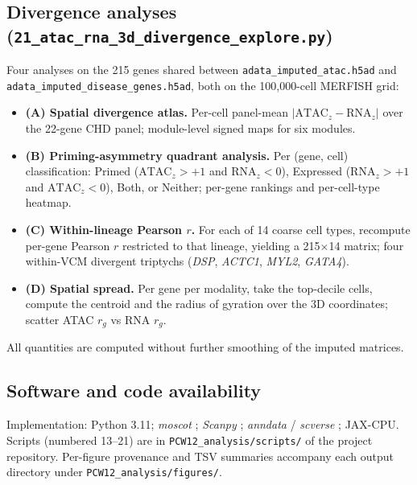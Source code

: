 \documentclass[11pt,a4paper]{article}
\begin{document}
\subsection{Divergence analyses
(\texttt{21\_atac\_rna\_3d\_divergence\_explore.py})}
Four analyses on the 215 genes shared between
\texttt{adata\_imputed\_atac.h5ad} and
\texttt{adata\_imputed\_disease\_genes.h5ad}, both on the 100{,}000-cell
MERFISH grid:
\begin{itemize}[leftmargin=1.2em,topsep=0pt,itemsep=2pt]
\item \textbf{(A) Spatial divergence atlas.} Per-cell panel-mean
      \(\lvert\mathrm{ATAC}_z-\mathrm{RNA}_z\rvert\) over the 22-gene CHD
      panel; module-level signed maps for six modules.
\item \textbf{(B) Priming-asymmetry quadrant analysis.} Per (gene, cell)
      classification: Primed (\(\mathrm{ATAC}_z>+1\) and \(\mathrm{RNA}_z<0\)),
      Expressed (\(\mathrm{RNA}_z>+1\) and \(\mathrm{ATAC}_z<0\)), Both, or
      Neither; per-gene rankings and per-cell-type heatmap.
\item \textbf{(C) Within-lineage Pearson \(r\).} For each of 14 coarse cell
      types, recompute per-gene Pearson \(r\) restricted to that lineage,
      yielding a 215\(\times\)14 matrix; four within-VCM divergent triptychs
      (\emph{DSP}, \emph{ACTC1}, \emph{MYL2}, \emph{GATA4}).
\item \textbf{(D) Spatial spread.} Per gene per modality, take the top-decile
      cells, compute the centroid and the radius of gyration over the 3D
      coordinates; scatter ATAC \(r_g\) vs RNA \(r_g\).
\end{itemize}
All quantities are computed without further smoothing of the imputed
matrices.

\subsection{Software and code availability}
Implementation: Python 3.11; \emph{moscot} \citep{klein2025moscot};
\emph{Scanpy} \citep{wolf2018scanpy}; \emph{anndata} / \emph{scverse}
\citep{virshup2023scverse}; JAX-CPU. Scripts (numbered 13--21) are in
\texttt{PCW12\_analysis/scripts/} of the project repository. Per-figure
provenance and TSV summaries accompany each output directory under
\texttt{PCW12\_analysis/figures/}.



\end{document}
